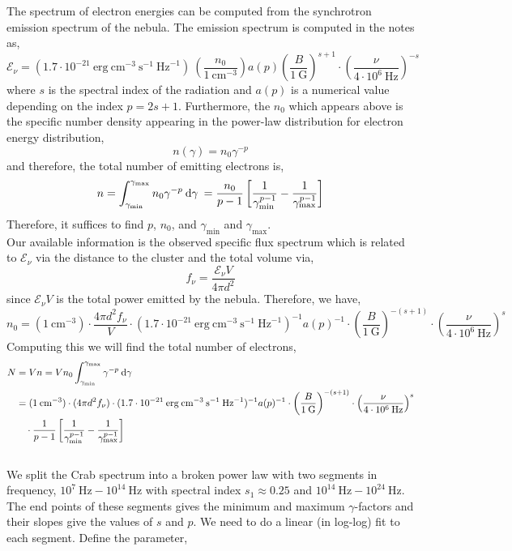 \documentclass[12pt]{article}
\begin{document}
The spectrum of electron energies can be computed from the synchrotron emission spectrum of the nebula. The emission spectrum is computed in the notes as,
\[ \mathcal{E}_\nu = (1.7 \cdot 10^{-21} \: \mathrm{erg} \: \mathrm{cm}^{-3} \: \mathrm{s}^{-1} \: \mathrm{Hz}^{-1})  \: \left( \frac{n_0}{1 \: \mathrm{cm}^{-3}} \right) a(p) \left( \frac{B}{1 \: \mathrm{G}} \right)^{s + 1} \cdot \left( \frac{\nu}{4 \cdot 10^6 \: \mathrm{Hz}} \right)^{-s} \]
where $s$ is the spectral index of the radiation and $a(p)$ is a numerical value depending on the index $p = 2 s + 1$. Furthermore, the $n_0$ which appears above is the specific number density appearing in the power-law distribution for electron energy distribution,
\[ n(\gamma) = n_0 \gamma^{-p} \]
and therefore, the total number of emitting electrons is,
\[ n = \int_{\gamma_{\text{min}}}^{\gamma_{\text{max}}} n_0 \gamma^{-p} \: \mathrm{d}\gamma \: = \frac{n_0}{p - 1} \left[ \frac{1}{\gamma_{\text{min}}^{p - 1}} - \frac{1}{\gamma_{\text{max}}^{p-1}} \right] \]
Therefore, it suffices to find $p$, $n_0$, and $\gamma_{\text{min}}$ and $\gamma_{\text{max}}$. 
\bigskip\\
Our available information is the observed specific flux spectrum which is related to $\mathcal{E}_\nu$ via the distance to the cluster and the total volume via,
\[ f_{\nu} = \frac{\mathcal{E}_\nu V}{4 \pi d^2} \]
since $\mathcal{E}_\nu V$ is the total power emitted by the nebula. Therefore, we have,
\[ n_0 = (1 \: \mathrm{cm}^{-3}) \cdot \frac{4 \pi d^2 f_\nu}{V} \cdot (1.7 \cdot 10^{-21} \: \mathrm{erg} \: \mathrm{cm}^{-3} \: \mathrm{s}^{-1} \: \mathrm{Hz}^{-1})^{-1} a(p)^{-1} \cdot \left( \frac{B}{1 \: \mathrm{G}} \right)^{-(s + 1)} \cdot \left( \frac{\nu}{4 \cdot 10^6 \: \mathrm{Hz}} \right)^{s} \]
Computing this we will find the total number of electrons,
\begin{align*}
N & = V n = V n_0 \int_{\gamma_{\text{min}}}^{\gamma_{\text{max}}} \gamma^{-p} \: \mathrm{d}\gamma \: 
\\
& = (1 \: \mathrm{cm}^{-3}) \cdot (4 \pi d^2 f_\nu) \cdot (1.7 \cdot 10^{-21} \: \mathrm{erg} \: \mathrm{cm}^{-3} \: \mathrm{s}^{-1} \: \mathrm{Hz}^{-1})^{-1} a(p)^{-1} \cdot \left( \frac{B}{1 \: \mathrm{G}} \right)^{-(s + 1)} \cdot \left( \frac{\nu}{4 \cdot 10^6 \: \mathrm{Hz}} \right)^{s} 
\\
& \quad \cdot \frac{1}{p - 1} \left[ \frac{1}{\gamma_{\text{min}}^{p - 1}} - \frac{1}{\gamma_{\text{max}}^{p-1}} \right] 
\end{align*} 
\bigskip\\
We split the Crab spectrum into a broken power law with two segments in frequency, $10^{7} \: \mathrm{Hz} - 10^{14} \: \mathrm{Hz}$ with spectral index $s_1 \approx 0.25$ and $10^{14} \: \mathrm{Hz} - 10^{24} \: \mathrm{Hz}$. The end points of these segments gives the minimum and maximum $\gamma$-factors and their slopes give the values of $s$ and $p$. We need to do a linear (in log-log) fit to each segment. Define the parameter,
\end{document}
